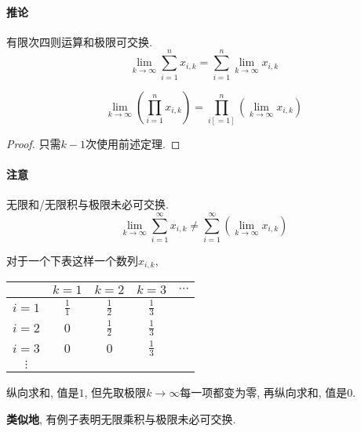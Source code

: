 
\paragraph{推论}
有限次四则运算和极限可交换.
\begin{equation}
    \lim_{k \to \infty}\sum_{i=1}^{n} x_{i,k} = \sum_{i=1}^{n} \lim_{k \to \infty} x_{i,k}
\end{equation}

\begin{equation}
    \lim_{k \to \infty}\left( \prod_{i=1}^{n} x_{i,k} \right) = \prod_{i[=1]}^{n} \left( \lim_{k \to \infty} x_{i,k} \right)  
\end{equation}

\begin{proof}
    只需$k-1$次使用前述定理.
\end{proof}
\paragraph{注意} 无限和/无限积与极限未必可交换.
\begin{equation}
    \lim_{k \to \infty}\sum_{i=1}^{\infty} x_{i,k} \neq \sum_{i=1}^{\infty} \left( \lim_{k \to \infty}x_{i,k} \right) 
\end{equation}
\begin{example}
   对于一个下表这样一个数列$x_{i,k}$,
   \begin{center}
    \begin{tabular}{c|c|c|c|c}
           &$k=1$&$k=2$  &$k=3$  &$\cdots$    \\ \hline
      $i=1$&$\frac{1}{1}$  &$\frac{1}{2}$  &$\frac{1}{3}$  &  \\ \hline
      $i=2$&$0$  &$\frac{1}{2}$  &$\frac{1}{3}$  &  \\ \hline
      $i=3$&$0$  &$0$  &$\frac{1}{3}$  &  \\ \hline
      $\vdots$
    \end{tabular}
  \end{center}
  纵向求和, 值是$1$, 但先取极限$k\to \infty$每一项都变为零, 再纵向求和, 值是$0$.
\end{example}

\textbf{类似地}, 有例子表明无限乘积与极限未必可交换.

